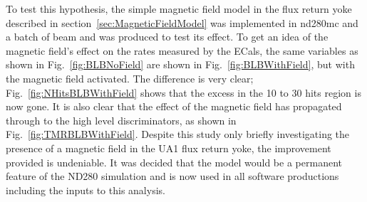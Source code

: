 To test this hypothesis, the simple magnetic field model in the flux return yoke described in section~\ref{sec:MagneticFieldModel} was implemented in nd280mc and a batch of beam and  was produced to test its effect.  To get an idea of the magnetic field's effect on the rates measured by the ECals, the same variables as shown in Fig.~\ref{fig:BLBNoField} are shown in Fig.~\ref{fig:BLBWithField}, but with the magnetic field activated.  The difference is very clear; Fig.~\ref{fig:NHitsBLBWithField} shows that the excess in the 10 to 30 hits region is now gone.  It is also clear that the effect of the magnetic field has propagated through to the high level discriminators, as shown in Fig.~\ref{fig:TMRBLBWithField}.
\newline
\newline
Despite this study only briefly investigating the presence of a magnetic field in the UA1 flux return yoke, the improvement provided is undeniable.  It was decided that the model would be a permanent feature of the ND280 simulation and is now used in all software productions including the inputs to this analysis.
